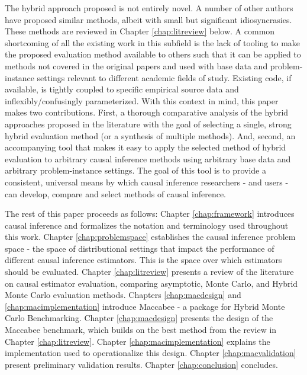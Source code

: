 \documentclass[../main.tex]{subfiles}
\begin{document}
\vspace{\baselineskip}
The hybrid approach proposed is not entirely novel. A number of other authors have proposed similar methods, albeit with small but significant idiosyncrasies. These methods are reviewed in Chapter \ref{chap:litreview} below. A common shortcoming of all the existing work in this subfield is the lack of tooling to make the proposed evaluation method available to others such that it can be applied to methods not covered in the original papers and used with base data and problem-instance settings relevant to different academic fields of study. Existing code, if available, is tightly coupled to specific empirical source data and inflexibly/confusingly parameterized. With this context in mind, this paper makes two contributions. First, a thorough comparative analysis of the hybrid approaches proposed in the literature with the goal of selecting a single, strong hybrid evaluation method (or a synthesis of multiple methods). And, second, an accompanying tool that makes it easy to apply the selected method of hybrid evaluation to arbitrary causal inference methods using arbitrary base data and arbitrary problem-instance settings. The goal of this tool is to provide a consistent, universal means by which causal inference researchers - and users - can develop, compare and select methods of causal inference.\par


\vspace{\baselineskip}
The rest of this paper proceeds as follows: Chapter \ref{chap:framework} introduces causal inference and formalizes the notation and terminology used throughout this work. Chapter \ref{chap:problemspace} establishes the causal inference problem space - the space of distributional settings that impact the performance of different causal inference estimators. This is the space over which estimators should be evaluated. Chapter \ref{chap:litreview} presents a review of the literature on causal estimator evaluation, comparing asymptotic, Monte Carlo, and Hybrid Monte Carlo evaluation methods. Chapters \ref{chap:macdesign} and \ref{chap:macimplementation} introduce Maccabee - a package for Hybrid Monte Carlo Benchmarking. Chapter \ref{chap:macdesign} presents the design of the Maccabee benchmark, which builds on the best method from the review in Chapter \ref{chap:litreview}. Chapter \ref{chap:macimplementation} explains the implementation used to operationalize this design. Chapter \ref{chap:macvalidation} present preliminary validation results. Chapter \ref{chap:conclusion} concludes.\par
\end{document}
